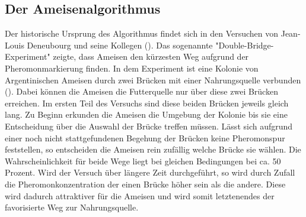\documentclass[doktyp=barbeit, sprache=german]{TUBAFarbeiten}
\begin{document}
\subsection{Der Ameisenalgorithmus}
Der historische Ursprung des Algorithmus findet sich in den Versuchen von Jean-Louis Deneubourg und seine Kollegen (\cite{Biological}). Das sogenannte "Double-Bridge-Experiment" zeigte, dass Ameisen den kürzesten Weg aufgrund der Pheromonmarkierung finden. In dem Experiment ist eine Kolonie von Argentinischen Ameisen durch zwei Brücken mit einer Nahrungsquelle verbunden (\cite{Dorigo:2007}). Dabei können die Ameisen die Futterquelle nur über diese zwei Brücken erreichen. Im ersten Teil des Versuchs sind diese beiden Brücken jeweils gleich lang. Zu Beginn erkunden die Ameisen die Umgebung der Kolonie bis sie eine Entscheidung über die Auswahl der Brücke treffen müssen. Lässt sich aufgrund einer noch nicht stattgefundenen Begehung der Brücken keine Pheromonspur feststellen, so entscheiden die Ameisen rein zufällig welche Brücke sie wählen. Die Wahrscheinlichkeit für beide Wege liegt bei gleichen Bedingungen bei ca. 50 Prozent. Wird der Versuch über längere Zeit durchgeführt, so wird durch Zufall die Pheromonkonzentration der einen Brücke höher sein als die andere. Diese wird dadurch attraktiver für die Ameisen und wird somit letztenendes der favorisierte Weg zur Nahrungsquelle.
\newpage
{}
\end{document}
